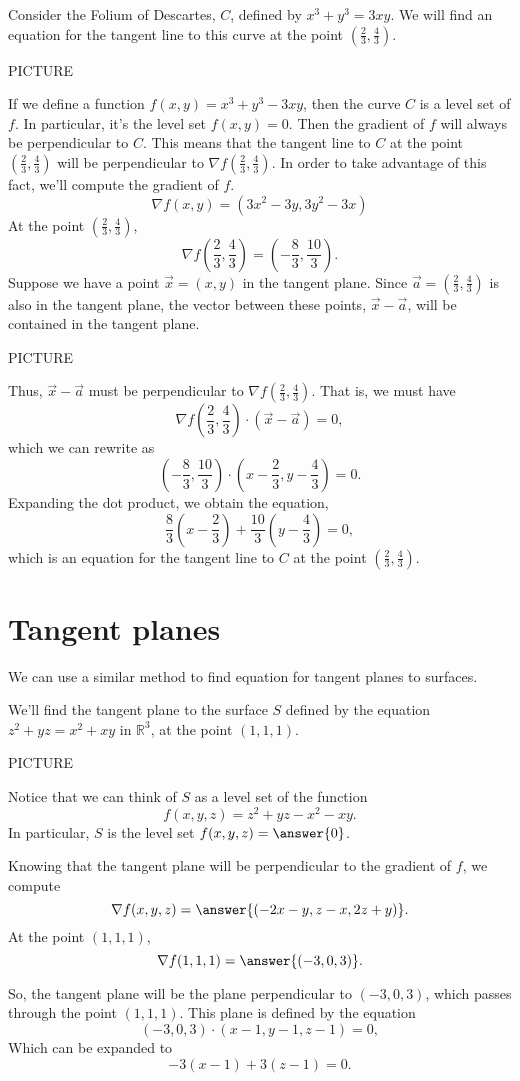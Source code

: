 \documentclass{ximera}
\begin{document}
\begin{example}
Consider the Folium of Descartes, $C$, defined by $x^3+y^3=3xy$. We will find an equation for the tangent line to this curve at the point $\left(\frac{2}{3}, \frac{4}{3}\right)$.

PICTURE

If we define a function $f(x,y) = x^3+y^3-3xy$, then the curve $C$ is a level set of $f$. In particular, it's the level set $f(x,y)=0$. Then the gradient of $f$ will always be perpendicular to $C$. This means that the tangent line to $C$ at the point $\left(\frac{2}{3}, \frac{4}{3}\right)$ will be perpendicular to $\nabla f\left(\frac{2}{3}, \frac{4}{3}\right)$. In order to take advantage of this fact, we'll compute the gradient of $f$.
\[
\nabla f(x,y) = (3x^2-3y,3y^2-3x)
\]
At the point $\left(\frac{2}{3}, \frac{4}{3}\right)$,
\[
\nabla f\left(\frac{2}{3}, \frac{4}{3}\right) = \left(-\frac{8}{3},\frac{10}{3}\right).
\]
Suppose we have a point $\vec{x} = (x,y)$ in the tangent plane. Since $\vec{a} = \left(\frac{2}{3}, \frac{4}{3}\right)$ is also in the tangent plane, the vector between these points, $\vec{x}-\vec{a}$, will be contained in the tangent plane.

PICTURE

Thus, $\vec{x}-\vec{a}$ must be perpendicular to $\nabla f\left(\frac{2}{3}, \frac{4}{3}\right)$. That is, we must have
\[
\nabla f\left(\frac{2}{3}, \frac{4}{3}\right)\cdot (\vec{x}-\vec{a}) = 0,
\]
which we can rewrite as
\[
\left(-\frac{8}{3},\frac{10}{3}\right) \cdot \left(x - \frac{2}{3}, y-\frac{4}{3}\right)=0.
\]
Expanding the dot product, we obtain the equation,
\[
\frac{8}{3}\left(x-\frac{2}{3}\right)+\frac{10}{3}\left(y-\frac{4}{3}\right)=0,
\]
which is an equation for the tangent line to $C$ at the point $\left(\frac{2}{3}, \frac{4}{3}\right)$.
\end{example}

\section*{Tangent planes}

We can use a similar method to find equation for tangent planes to surfaces.

\begin{example}
We'll find the tangent plane to the surface $S$ defined by the equation $z^2 +yz = x^2+xy$ in $\mathbb{R}^3$, at the point $(1,1,1)$.

PICTURE

Notice that we can think of $S$ as a level set of the function 
\[
f(x,y,z) = z^2+yz-x^2-xy.
\]
In particular, $S$ is the level set $f(x,y,z) = \answer{0}$.

Knowing that the tangent plane will be perpendicular to the gradient of $f$, we compute
\[
\nabla f(x,y,z) = \answer{(-2x-y,z-x,2z+y)}.
\]
At the point $(1,1,1)$, 
\[
\nabla f(1,1,1) = \answer{(-3, 0, 3)}.
\]

So, the tangent plane will be the plane perpendicular to $(-3,0,3)$, which passes through the point $(1,1,1)$. This plane is defined by the equation
\[
(-3,0,3)\cdot (x-1, y-1, z-1) = 0,
\]
Which can be expanded to
\[
-3(x-1)+3(z-1) = 0.
\]
\end{example}
\end{document}
